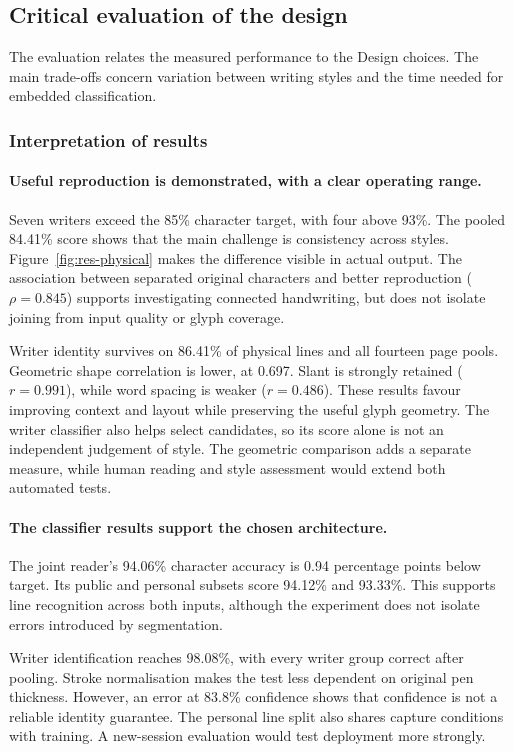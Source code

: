 \label{sec:discussion}
\subsection{Critical evaluation of the design}
\label{sec:dis-critical}
The evaluation relates the measured performance to the Design choices. The main trade-offs concern variation between writing styles and the time needed for embedded classification.

\subsubsection{Interpretation of results}
\label{sec:dis-interpretation}
\paragraph{Useful reproduction is demonstrated, with a clear operating range.}
Seven writers exceed the 85\% character target, with four above 93\%. The pooled 84.41\% score shows that the main challenge is consistency across styles. Figure~\ref{fig:res-physical} makes the difference visible in actual output. The association between separated original characters and better reproduction ($\rho=0.845$) supports investigating connected handwriting, but does not isolate joining from input quality or glyph coverage.

Writer identity survives on 86.41\% of physical lines and all fourteen page pools. Geometric shape correlation is lower, at 0.697. Slant is strongly retained ($r=0.991$), while word spacing is weaker ($r=0.486$). These results favour improving context and layout while preserving the useful glyph geometry. The writer classifier also helps select candidates, so its score alone is not an independent judgement of style. The geometric comparison adds a separate measure, while human reading and style assessment would extend both automated tests.

\paragraph{The classifier results support the chosen architecture.}
The joint reader's 94.06\% character accuracy is 0.94 percentage points below target. Its public and personal subsets score 94.12\% and 93.33\%. This supports line recognition across both inputs, although the experiment does not isolate errors introduced by segmentation.

Writer identification reaches 98.08\%, with every writer group correct after pooling. Stroke normalisation makes the test less dependent on original pen thickness. However, an error at 83.8\% confidence shows that confidence is not a reliable identity guarantee. The personal line split also shares capture conditions with training. A new-session evaluation would test deployment more strongly.

